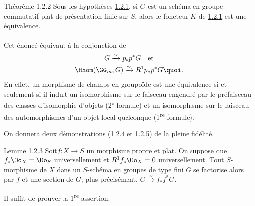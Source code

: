 \begin{enonce*}{Théorème 1.2.2}
Sous les hypothèses \hyperref[XVIII.subsubsec1.2.1]{1.2.1}, si $G$ est un schéma
en groupe commutatif plat de présentation finie sur $S$, alors le
foncteur $K$ de \hyperref[XVIII.subsubsec1.2.1]{1.2.1} est une équivalence.
\end{enonce*}

\setcounter{subsubsection}{2}
\paragraph{}

Cet énoncé équivaut à la conjonction de
\begin{gather*}
G\xrightarrow{\sim} p_{\ast}p^{\ast}G\quad\mbox{\rm et}\\
\Hhom(\GG_{m},G)\xrightarrow{\sim} R^{1}p_{\ast}p^{\ast}G{\quoi}.
\end{gather*}
En effet, un morphisme de champs en groupoïde est une équivalence si
et seulement si il induit un isomorphisme sur le faisceau engendré par
le préfaisceau des classes d'isomorphie d'objets (2\textsuperscript{e} formule) et un
isomorphisme sur le faisceau des automorphismes d'un objet local
quelconque (1\textsuperscript{re} formule).

On donnera deux démonstrations (\hyperref[XVIII.lem1.2.4]{1.2.4} et
\hyperref[XVIII.subsubsec1.2.5]{1.2.5}) de la pleine fidélité.

\begin{enonce*}{Lemme 1.2.3}
Soit\pageoriginale $f:X\rightarrow S$ un morphisme propre et plat. On
suppose que $f_{\ast}\Oo_{X}=\Oo_{S}$ universellement et
$R^{1}f_{\ast}\Oo_{X}=0$ universellement. Tout $S$-morphisme de $X$
dans un $S$-schéma en groupes de type fini $G$ se factorise alors par
$f$ et une section de $G$; plus précisément, $G\xrightarrow{\sim}
f_{\ast}f^{\ast}G$.
\end{enonce*}

Il suffit de prouver la 1\textsuperscript{re} assertion.

